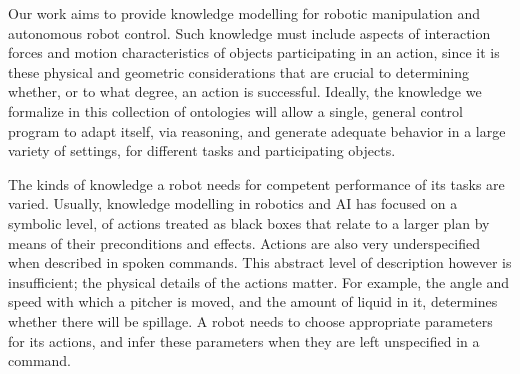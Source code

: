 Our work aims to provide knowledge modelling for robotic manipulation and autonomous robot control. Such knowledge must include aspects of interaction forces and motion characteristics of objects participating in an action, since it is these physical and geometric considerations that are crucial to determining whether, or to what degree, an action is successful. Ideally, the knowledge we formalize in this collection of ontologies will allow a single, general control program to adapt itself, via reasoning, and generate adequate behavior in a large variety of settings, for different tasks and participating objects.

The kinds of knowledge a robot needs for competent performance of its tasks are varied. Usually, knowledge modelling in robotics and AI has focused on a symbolic level, of actions treated as black boxes that relate to a larger plan by means of their preconditions and effects. Actions are also very underspecified when described in spoken commands. This abstract level of description however is insufficient; the physical details of the actions matter. For example, the angle and speed with which a pitcher is moved, and the amount of liquid in it, determines whether there will be spillage. A robot needs to choose appropriate parameters for its actions, and infer these parameters when they are left unspecified in a command.

